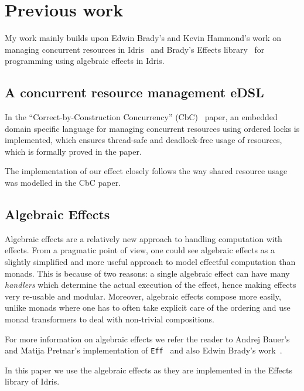 \section{Previous work}

My work mainly builds upon Edwin Brady's and Kevin Hammond's work on managing
concurrent resources in Idris~\cite{cbconc-fi} and Brady's Effects
library~\cite{effects-idr} for programming using algebraic effects in Idris.

\subsection{A concurrent resource management eDSL}

In the ``Correct-by-Construction Concurrency'' (CbC)~\cite{cbconc-fi} paper, an
embedded domain specific language for managing concurrent resources using
ordered locks is implemented, which ensures thread-safe and deadlock-free usage
of resources, which is formally proved in the paper.

The implementation of our effect closely follows the way shared resource usage
was modelled in the CbC paper.

\subsection{Algebraic Effects}

Algebraic effects are a relatively new approach to handling computation with
effects. From a pragmatic point of view, one could see algebraic effects as a
slightly simplified and more useful approach to model effectful computation than
monads. This is because of two reasons: a single algebraic effect can have many
\emph{handlers} which determine the actual execution of the effect, hence
making effects very re-usable and modular. Moreover, algebraic effects compose
more easily, unlike monads where one has to often take explicit care of the
ordering and use monad transformers to deal with non-trivial compositions.

For more information on algebraic effects we refer the reader to Andrej Bauer's
and Matija Pretnar's implementation of \texttt{Eff}~\cite{eff} and also Edwin Brady's work~\cite{effects-idr}.

In this paper we use the algebraic effects as they are implemented in the
Effects library of Idris.
